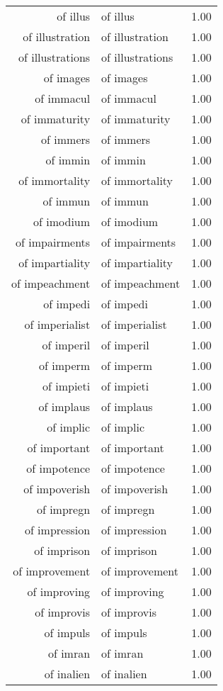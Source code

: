 \begin{table}[ht]
\begin{tabular}{rlr}
  of illus & of illus & 1.00 \\ 
  of illustration & of illustration & 1.00 \\ 
  of illustrations & of illustrations & 1.00 \\ 
  of images & of images & 1.00 \\ 
  of immacul & of immacul & 1.00 \\ 
  of immaturity & of immaturity & 1.00 \\ 
  of immers & of immers & 1.00 \\ 
  of immin & of immin & 1.00 \\ 
  of immortality & of immortality & 1.00 \\ 
  of immun & of immun & 1.00 \\ 
  of imodium & of imodium & 1.00 \\ 
  of impairments & of impairments & 1.00 \\ 
  of impartiality & of impartiality & 1.00 \\ 
  of impeachment & of impeachment & 1.00 \\ 
  of impedi & of impedi & 1.00 \\ 
  of imperialist & of imperialist & 1.00 \\ 
  of imperil & of imperil & 1.00 \\ 
  of imperm & of imperm & 1.00 \\ 
  of impieti & of impieti & 1.00 \\ 
  of implaus & of implaus & 1.00 \\ 
  of implic & of implic & 1.00 \\ 
  of important & of important & 1.00 \\ 
  of impotence & of impotence & 1.00 \\ 
  of impoverish & of impoverish & 1.00 \\ 
  of impregn & of impregn & 1.00 \\ 
  of impression & of impression & 1.00 \\ 
  of imprison & of imprison & 1.00 \\ 
  of improvement & of improvement & 1.00 \\ 
  of improving & of improving & 1.00 \\ 
  of improvis & of improvis & 1.00 \\ 
  of impuls & of impuls & 1.00 \\ 
  of imran & of imran & 1.00 \\ 
  of inalien & of inalien & 1.00 \\ 

\end{tabular}
\end{table}
